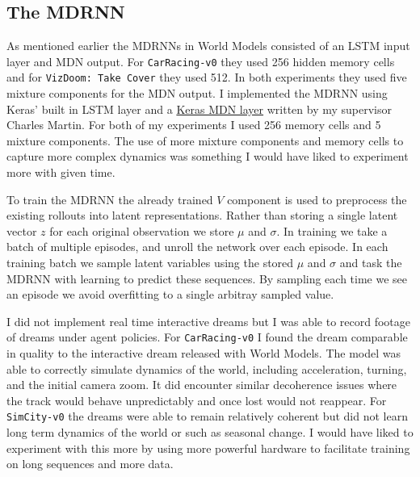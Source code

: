 \documentclass{article}
\numberwithin{figure}{section}
\theoremstyle{definition}
\begin{document}
\subsection{The MDRNN}
\label{MDRNNsubsec}
As mentioned earlier the MDRNNs in World Models consisted of an LSTM input layer and MDN output.
For \texttt{CarRacing-v0} they used 256 hidden memory cells and for \texttt{VizDoom: Take Cover} they used 512.
In both experiments they used five mixture components for the MDN output.
I implemented the MDRNN using Keras' built in LSTM layer and a \href{https://github.com/cpmpercussion/keras-mdn-layer}{Keras MDN layer} written by my supervisor Charles Martin.
For both of my experiments I used 256 memory cells and 5 mixture components.
The use of more mixture components and memory cells to capture more complex dynamics was something I would have liked to experiment more with given time.

To train the MDRNN the already trained $V$ component is used to preprocess the existing rollouts into latent representations.
Rather than storing a single latent vector $z$ for each original observation we store $\mu$ and $\sigma$.
In training we take a batch of multiple episodes, and unroll the network over each episode.
In each training batch we sample latent variables using the stored $\mu$ and $\sigma$ and task the MDRNN with learning to predict these sequences.
By sampling each time we see an episode we avoid overfitting to a single arbitray sampled value.

I did not implement real time interactive dreams but I was able to record footage of dreams under agent policies.
For \texttt{CarRacing-v0} I found the dream comparable in quality to the interactive dream released with World Models.
The model was able to correctly simulate dynamics of the world, including acceleration, turning, and the initial camera zoom.
It did encounter similar decoherence issues where the track would behave unpredictably and once lost would not reappear.
For \texttt{SimCity-v0} the dreams were able to remain relatively coherent but did not learn long term dynamics of the world or such as seasonal change.
I would have liked to experiment with this more by using more powerful hardware to facilitate training on long sequences and more data.
\end{document}
